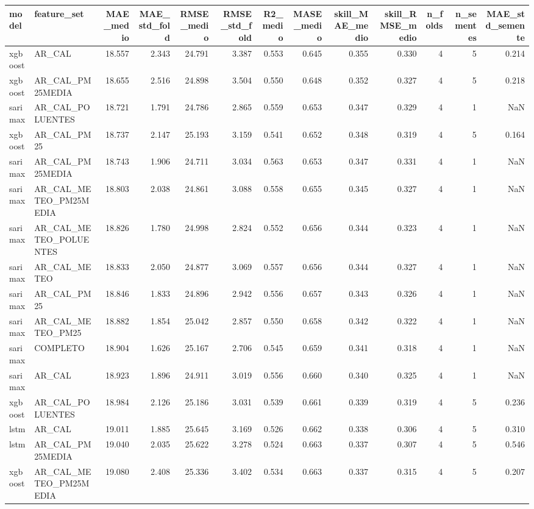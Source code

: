 \begin{tabular}{llrrrrrrrrrrr}
\toprule
model & feature_set & MAE_medio & MAE_std_fold & RMSE_medio & RMSE_std_fold & R2_medio & MASE_medio & skill_MAE_medio & skill_RMSE_medio & n_folds & n_sementes & MAE_std_semente \\
\midrule
xgboost & AR_CAL & 18.557 & 2.343 & 24.791 & 3.387 & 0.553 & 0.645 & 0.355 & 0.330 & 4 & 5 & 0.214 \\
xgboost & AR_CAL_PM25MEDIA & 18.655 & 2.516 & 24.898 & 3.504 & 0.550 & 0.648 & 0.352 & 0.327 & 4 & 5 & 0.218 \\
sarimax & AR_CAL_POLUENTES & 18.721 & 1.791 & 24.786 & 2.865 & 0.559 & 0.653 & 0.347 & 0.329 & 4 & 1 & NaN \\
xgboost & AR_CAL_PM25 & 18.737 & 2.147 & 25.193 & 3.159 & 0.541 & 0.652 & 0.348 & 0.319 & 4 & 5 & 0.164 \\
sarimax & AR_CAL_PM25MEDIA & 18.743 & 1.906 & 24.711 & 3.034 & 0.563 & 0.653 & 0.347 & 0.331 & 4 & 1 & NaN \\
sarimax & AR_CAL_METEO_PM25MEDIA & 18.803 & 2.038 & 24.861 & 3.088 & 0.558 & 0.655 & 0.345 & 0.327 & 4 & 1 & NaN \\
sarimax & AR_CAL_METEO_POLUENTES & 18.826 & 1.780 & 24.998 & 2.824 & 0.552 & 0.656 & 0.344 & 0.323 & 4 & 1 & NaN \\
sarimax & AR_CAL_METEO & 18.833 & 2.050 & 24.877 & 3.069 & 0.557 & 0.656 & 0.344 & 0.327 & 4 & 1 & NaN \\
sarimax & AR_CAL_PM25 & 18.846 & 1.833 & 24.896 & 2.942 & 0.556 & 0.657 & 0.343 & 0.326 & 4 & 1 & NaN \\
sarimax & AR_CAL_METEO_PM25 & 18.882 & 1.854 & 25.042 & 2.857 & 0.550 & 0.658 & 0.342 & 0.322 & 4 & 1 & NaN \\
sarimax & COMPLETO & 18.904 & 1.626 & 25.167 & 2.706 & 0.545 & 0.659 & 0.341 & 0.318 & 4 & 1 & NaN \\
sarimax & AR_CAL & 18.923 & 1.896 & 24.911 & 3.019 & 0.556 & 0.660 & 0.340 & 0.325 & 4 & 1 & NaN \\
xgboost & AR_CAL_POLUENTES & 18.984 & 2.126 & 25.186 & 3.031 & 0.539 & 0.661 & 0.339 & 0.319 & 4 & 5 & 0.236 \\
lstm & AR_CAL & 19.011 & 1.885 & 25.645 & 3.169 & 0.526 & 0.662 & 0.338 & 0.306 & 4 & 5 & 0.310 \\
lstm & AR_CAL_PM25MEDIA & 19.040 & 2.035 & 25.622 & 3.278 & 0.524 & 0.663 & 0.337 & 0.307 & 4 & 5 & 0.546 \\
xgboost & AR_CAL_METEO_PM25MEDIA & 19.080 & 2.408 & 25.336 & 3.402 & 0.534 & 0.663 & 0.337 & 0.315 & 4 & 5 & 0.207 \\

\end{tabular}
